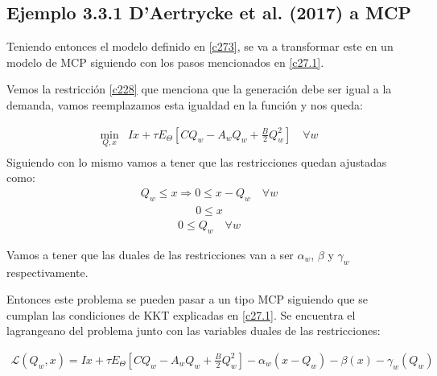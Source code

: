 \subsection{Ejemplo 3.3.1 D’Aertrycke et al. (2017) a MCP}\label{c37.1}

Teniendo entonces el modelo definido en \ref{c273}, se va a transformar este en un modelo de MCP siguiendo con los pasos mencionados en \ref{c27.1}.

\vspace{2.5mm}
Vemos la restricción \ref{c228} que menciona que la generación debe ser igual a la demanda, vamos reemplazamos esta igualdad en la función y nos queda:

\begin{equation}
\begin{array}{rrclcl}
    \displaystyle \min_{Q,x} & Ix+\tau E_{\Theta}[CQ_w-A_wQ_w+\frac{B}{2}Q_w^2] \quad \forall w \\\label{c372}
\end{array}
\end{equation}
Siguiendo con lo mismo vamos a tener que las restricciones quedan ajustadas como:
\begin{equation}
\begin{array}{cl}
    Q_w \leq x \Rightarrow 0 \leq x - Q_w \quad \forall w \label{c314}
\end{array}
\end{equation}
\begin{equation}
\begin{array}{cl}
   0\leq x \label{c315}
\end{array}
\end{equation}
\begin{equation}
\begin{array}{cl}
   0\leq Q_w   \quad \forall w  \label{c316}
\end{array}
\end{equation}



Vamos a tener que las duales de las restricciones van a ser $\alpha_w$, $\beta$ y $\gamma_w$ respectivamente.
\vspace{2.5mm}

Entonces este problema se pueden pasar a un tipo MCP siguiendo que se cumplan las condiciones de KKT explicadas en \ref{c27.1}. Se encuentra el lagrangeano  del problema junto con las variables duales de las restricciones:

\begin{eqnarray}
\mathcal{L}(Q_w,x) = Ix+\tau E_{\Theta}[CQ_w-A_wQ_w+\frac{B}{2}Q_w^2] - \alpha_w(x - Q_w) - \beta(x)- \gamma_w(Q_w) \label{c317}
\end{eqnarray}

